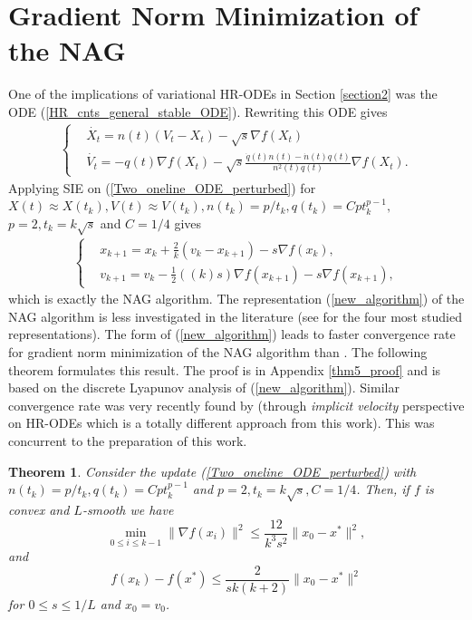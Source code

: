 \documentclass{article}
\theoremstyle{plain}
\newtheorem{theorem}{Theorem}[section]
\theoremstyle{definition}
\theoremstyle{remark}
\begin{document}
\section{Gradient Norm Minimization of the NAG}\label{section3}
One of the implications of variational HR-ODEs in Section \ref{section2} was the ODE (\ref{HR_cnts_general_stable_ODE}). Rewriting this ODE gives
\begin{align}\label{Two_oneline_ODE_perturbed}
   \left\{ \begin{array}{ll}
    & \dot{X_t}   =     n(t)(V_t-X_t)-\sqrt{s}\nabla f(X_t)\\
     &\dot{V_t}    =  -q(t)\nabla f(X_t) - \sqrt{s}\frac{\dot q(t)n(t)-\dot n(t)q(t)}{n^2(t)q(t)} \nabla f(X_t).
    \end{array}\right.
\end{align}
Applying SIE on (\ref{Two_oneline_ODE_perturbed}) for \({X(t) \approx X(t_k), V(t)\approx V(t_k),n(t_k)=p/t_k,q(t_k)=Cpt_k^{p-1},}\) 
\({ p=2,t_k=k\sqrt{s}}\) and \(C=1/4\) gives 
\begin{align}\label{new_algorithm}
   \left\{ \begin{array}{ll}
    &x_{k+1}   =    x_{k} + \frac{2}{k}(v_k-x_{k+1})-{s}\nabla f(x_k),\\
     &v_{k+1}    = v_k -\tfrac{1}{2}((k)s)\nabla f(x_{k+1})-s\nabla f(x_{k+1}), 
    \end{array}\right.
\end{align}
 which is exactly the NAG algorithm. The representation (\ref{new_algorithm}) of the NAG algorithm is less investigated in the literature (see \citep{ahn2022understanding} for the four most studied representations). The form of (\ref{new_algorithm}) leads to faster convergence rate for gradient norm minimization of the NAG algorithm than \citep{Shi2021UnderstandingTA}. The following theorem formulates this result. The proof is in Appendix \ref{thm5_proof} and is based on the discrete Lyapunov analysis of (\ref{new_algorithm}). Similar convergence rate was very recently found by \citep{chen2022gradient} (through \textit{implicit velocity} perspective on HR-ODEs which is a totally different approach from this work). This was concurrent to the preparation of this work.
\begin{theorem}\label{theorem4}
    Consider the update (\ref{Two_oneline_ODE_perturbed}) with \(n(t_k)=p/t_k,q(t_k)=Cpt_k^{p-1}\) and \(p=2,t_k=k\sqrt{s},C=1/4\). Then, if \(f\) is convex and \(L\)-smooth we have
    \[\min_{0\leq i\leq k-1}\|\nabla f(x_i)\|^2 \leq \frac{12}{k^3s^2}\|x_0-x^*\|^2,\]
    and
    \[f(x_k)-f(x^*)\leq \frac{2}{sk(k+2)}\|x_0-x^*\|^2\]
    for \(0\leq s\leq 1/L\) and \(x_0=v_0\).
\end{theorem}
\end{document}
